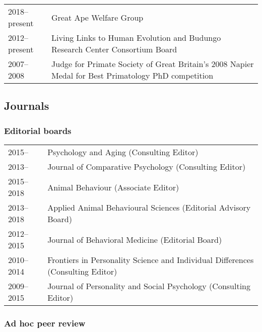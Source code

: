 \documentclass[11pt]{article}
\begin{document}
\begin{tabular}{p{3cm}p{12cm}}
2018--present & Great Ape Welfare Group \\
2012--present & Living Links to Human Evolution and Budungo Research
Center Consortium Board \\
2007--2008 & Judge for Primate Society of Great Britain's 2008 Napier Medal
for Best Primatology PhD competition

\end{tabular}

\subsection*{Journals}

\subsubsection*{Editorial boards}

\begin{tabular}{p{3cm}p{12cm}}
2015-- & Psychology and Aging (Consulting Editor) \\
2013-- & Journal of Comparative Psychology (Consulting Editor) \\
2015--2018 & Animal Behaviour (Associate Editor) \\
2013--2018 & Applied Animal Behavioural Sciences (Editorial Advisory Board) \\
2012--2015 & Journal of Behavioral Medicine (Editorial Board) \\
2010--2014 & Frontiers in Personality Science and Individual
Differences (Consulting Editor) \\
2009--2015 & Journal of Personality and Social Psychology (Consulting Editor)
\end{tabular}

\subsubsection*{Ad hoc peer review}
\end{document}
